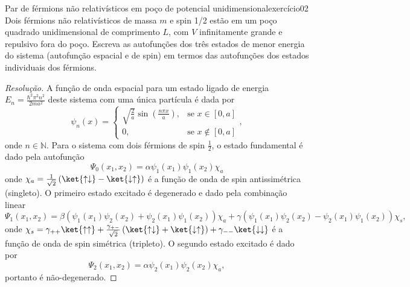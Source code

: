 \begin{exercício}{Par de férmions não relativísticos em poço de potencial unidimensional}{exercício02}
    Dois férmions não relativísticos de massa \(m\) e spin 1/2 estão em um poço quadrado unidimensional de comprimento \(L\), com \(V\) infinitamente grande e repulsivo fora do poço. Escreva as autofunções dos três estados de menor energia do sistema (autofunção espacial e de spin) em termos das autofunções dos estados individuais dos férmions.
\end{exercício}
\begin{proof}[Resolução]
    A função de onda espacial para um estado ligado de energia \(E_n = \frac{\hbar^2 \pi^2 n^2}{2m a^2}\) deste sistema com uma única partícula é dada por
    \begin{equation*}
        \psi_n(x) = \begin{cases}
            \sqrt{\frac{2}{a}}\sin\left(\frac{n\pi x}{a}\right),&\text{se }x \in [0,a]\\
            0,&\text{se }x \notin [0,a]
        \end{cases},
    \end{equation*}
    onde \(n \in \mathbb{N}\). Para o sistema com dois férmions de spin \(\frac12\), o estado fundamental é dado pela autofunção
    \begin{equation*}
        \Psi_0(x_1, x_2) = \alpha \psi_1(x_1)\psi_1(x_2) \chi_a
    \end{equation*}
    onde \(\chi_{a} = \frac1{\sqrt{2}}\left(\ket{\uparrow \downarrow} - \ket{\downarrow \uparrow}\right)\) é a função de onda de spin antissimétrica (singleto). O primeiro estado excitado é degenerado e dado pela combinação linear
    \begin{equation*}
        \Psi_1(x_1, x_2) = \beta \left(\psi_1(x_1)\psi_2(x_2) + \psi_2(x_1)\psi_1(x_2)\right) \chi_a + \gamma \left(\psi_1(x_1)\psi_2(x_2) - \psi_2(x_1)\psi_1(x_2)\right)\chi_s,
    \end{equation*}
    onde \(\chi_s = \gamma_{++}\ket{\uparrow \uparrow} + \frac{\gamma_{+-}}{\sqrt{2}}\left(\ket{\uparrow\downarrow} + \ket{\downarrow\uparrow}\right) + \gamma_{--}\ket{\downarrow \downarrow}\) é a função de onda de spin simétrica (tripleto). O segundo estado excitado é dado por
    \begin{equation*}
        \Psi_2(x_1,x_2) = \alpha \psi_2(x_1)\psi_2(x_2) \chi_a,
    \end{equation*}
    portanto é não-degenerado.
\end{proof}
